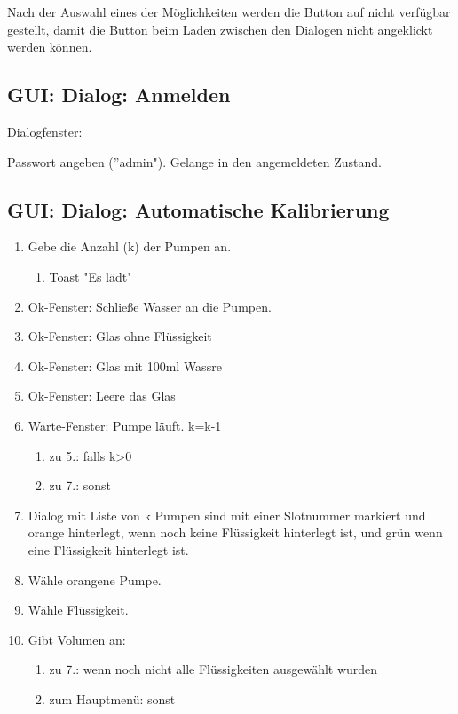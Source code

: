 Nach der Auswahl eines der Möglichkeiten werden die Button auf nicht verfügbar gestellt, damit die Button beim Laden zwischen den Dialogen nicht angeklickt werden können.

\subsection{GUI: Dialog: Anmelden}

Dialogfenster:

Passwort angeben (''admin"). Gelange in den angemeldeten Zustand.

\subsection{GUI: Dialog: Automatische Kalibrierung}

\begin{enumerate}
\item Gebe die Anzahl (k) der Pumpen an.
\begin{enumerate}
	\item Toast "Es lädt"	
\end{enumerate}
	\item Ok-Fenster: Schließe Wasser an die Pumpen.
	
	\item Ok-Fenster: Glas ohne Flüssigkeit
	
    \item Ok-Fenster: Glas mit 100ml Wassre
	
	\item Ok-Fenster: Leere das Glas
	
	\item Warte-Fenster: Pumpe läuft. k=k-1

\begin{enumerate}
		\item zu 5.: falls k>0
		
		\item zu 7.: sonst

\end{enumerate}
\item Dialog mit Liste von k Pumpen sind mit einer Slotnummer markiert und orange hinterlegt, wenn noch keine Flüssigkeit hinterlegt ist, und grün wenn eine Flüssigkeit hinterlegt ist.

\item Wähle orangene Pumpe.

\item Wähle Flüssigkeit.

\item Gibt Volumen an:
\begin{enumerate}

\item zu 7.: wenn noch nicht alle Flüssigkeiten ausgewählt wurden

\item zum Hauptmenü: sonst
\end{enumerate}
\end{enumerate}


